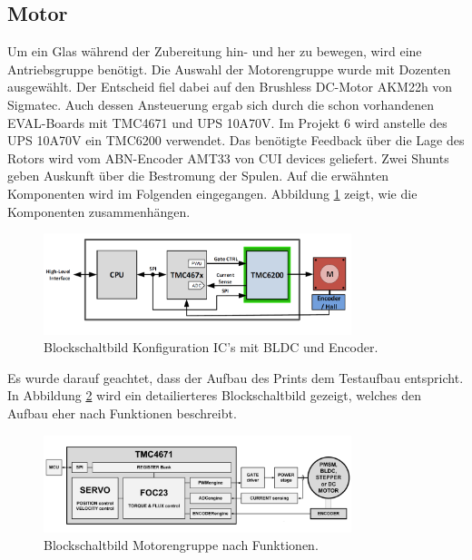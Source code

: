 \clearpage
\subsection{Motor}
\label{subsec:Motor}

Um ein Glas während der Zubereitung hin- und her zu bewegen, wird eine Antriebsgruppe benötigt. Die Auswahl der Motorengruppe wurde mit Dozenten ausgewählt. Der Entscheid fiel dabei auf den Brushless DC-Motor AKM22h von Sigmatec. Auch dessen Ansteuerung ergab sich durch die schon vorhandenen EVAL-Boards mit TMC4671 und UPS 10A70V. Im Projekt 6 wird anstelle des UPS 10A70V ein TMC6200 verwendet. Das benötigte Feedback über die Lage des Rotors wird vom ABN-Encoder AMT33 von CUI devices geliefert. Zwei Shunts geben Auskunft über die Bestromung der Spulen. Auf die erwähnten Komponenten wird im Folgenden eingegangen. Abbildung \ref{fig:Blockdiagramm_TMC4671_und_TMC6200} zeigt, wie die Komponenten zusammenhängen.

\begin{figure}[H]
	\centering
	\includegraphics[width=0.8\textwidth]{graphics/Blockdiagramm_TMC4671_und_TMC6200}
	\caption{Blockschaltbild Konfiguration IC's mit BLDC und Encoder. \cite[S.1]{trinamicmotion_control_gmbh__co_kg_tmc6200_2019}}
	\label{fig:Blockdiagramm_TMC4671_und_TMC6200}
\end{figure}

Es wurde darauf geachtet, dass der Aufbau des Prints dem Testaufbau entspricht. In Abbildung \ref{fig:Blockdiagramm_Motorengruppe} wird ein detailierteres Blockschaltbild gezeigt, welches den Aufbau eher nach Funktionen beschreibt.

\begin{figure}[H]
	\centering
	\includegraphics[width=0.8\textwidth]{graphics/Blockdiagramm_Motorengruppe}
	\caption{Blockschaltbild Motorengruppe nach Funktionen. \cite[S.1]{trinamicmotion_control_gmbh__co_kg_tmc4671_2019}}
	\label{fig:Blockdiagramm_Motorengruppe}
\end{figure}

